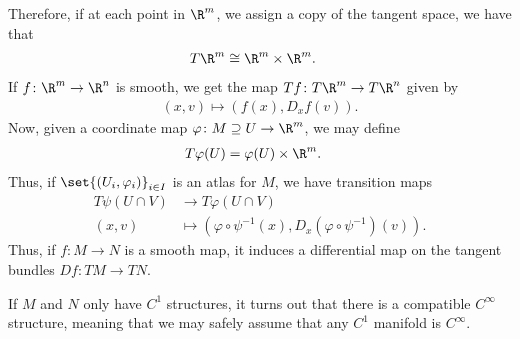 \documentclass[10pt]{mypackage}
\begin{document}
Therefore, if at each point in $\R^{m}$, we assign a copy of the tangent space, we have that
\begin{align*}
  T\R^{m} &\cong \R^{m}\times \R^{m}.
\end{align*}
If $f\colon \R^{m}\rightarrow \R^{n}$ is smooth, we get the map $Tf\colon T\R^{m}\rightarrow T\R^{n}$ given by
\begin{align*}
  \left( x,v \right) \mapsto \left( f(x),D_xf(v) \right).
\end{align*}
Now, given a coordinate map $\varphi\colon M\supseteq U\rightarrow \R^{m}$, we may define
\begin{align*}
  T\varphi(U) &= \varphi(U)\times \R^{m}.
\end{align*}
Thus, if $\set{\left( U_i,\varphi_i \right)}_{i\in I}$ is an atlas for $M$, we have transition maps
\begin{align*}
  T\psi\left( U\cap V \right)&\rightarrow T\varphi\left( U\cap V \right)\\
  \left( x,v \right) &\mapsto \left( \varphi\circ\psi^{-1}\left( x \right),D_{x}\left( \varphi\circ\psi^{-1} \right)\left( v \right) \right).
\end{align*}
Thus, if $f\colon M\rightarrow N$ is a smooth map, it induces a differential map on the tangent bundles $Df\colon TM\rightarrow TN$.
\begin{remark}
  If $M$ and $N$ only have $C^1$ structures, it turns out that there is a compatible $C^{\infty}$ structure, meaning that we may safely assume that any $C^{1}$ manifold is $C^{\infty}$.
\end{remark}
\end{document}
